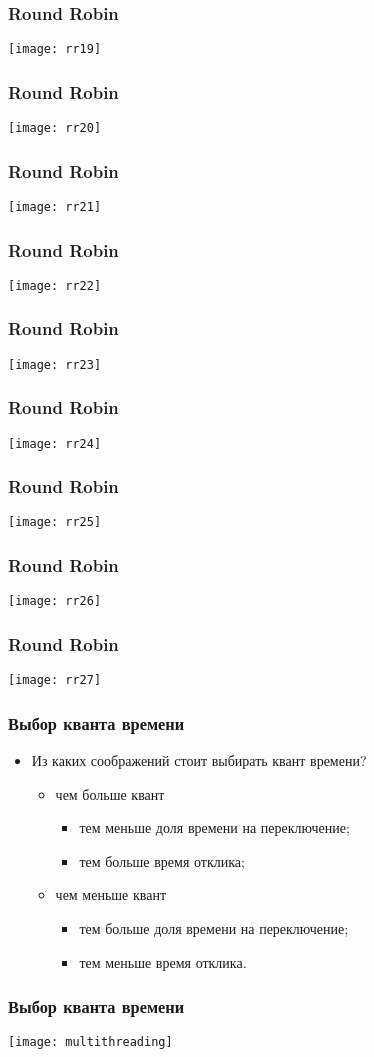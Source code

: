 \begin{frame}
\frametitle{Round Robin}
\texttt{[image: rr19]}
\end{frame}

\begin{frame}
\frametitle{Round Robin}
\texttt{[image: rr20]}
\end{frame}

\begin{frame}
\frametitle{Round Robin}
\texttt{[image: rr21]}
\end{frame}

\begin{frame}
\frametitle{Round Robin}
\texttt{[image: rr22]}
\end{frame}

\begin{frame}
\frametitle{Round Robin}
\texttt{[image: rr23]}
\end{frame}

\begin{frame}
\frametitle{Round Robin}
\texttt{[image: rr24]}
\end{frame}

\begin{frame}
\frametitle{Round Robin}
\texttt{[image: rr25]}
\end{frame}

\begin{frame}
\frametitle{Round Robin}
\texttt{[image: rr26]}
\end{frame}

\begin{frame}
\frametitle{Round Robin}
\texttt{[image: rr27]}
\end{frame}

\begin{frame}
\frametitle{Выбор кванта времени}
\begin{itemize}
    \item<1->Из каких соображений стоит выбирать квант времени?
    \begin{itemize}
        \item<2->чем больше квант
        \begin{itemize}
            \item<3->тем меньше доля времени на переключение;
            \item<3->тем больше время отклика;
        \end{itemize}
        \item<4->чем меньше квант
        \begin{itemize}
            \item<5->тем больше доля времени на переключение;
            \item<5->тем меньше время отклика.
        \end{itemize}
    \end{itemize}
\end{itemize}
\end{frame}

\begin{frame}
\frametitle{Выбор кванта времени}
\texttt{[image: multithreading]}
\end{frame}
